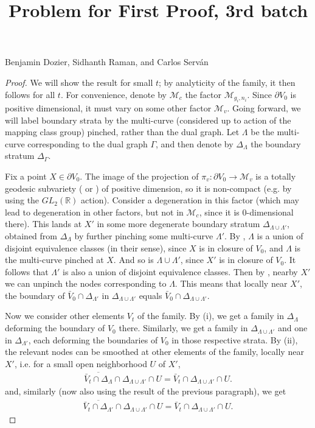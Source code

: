 \documentclass[11pt]{article}
\title{Problem for First Proof, 3rd batch }
\theoremstyle{plain}
\theoremstyle{definition}
\newcommand{\R}{\mathbb{R}}
\newcommand{\M}{\mathcal{M}}
\begin{document}
\begin{center}
{\large Benjamin Dozier, Sidhanth Raman, and Carlos Serv\'an}
\end{center}
\begin{proof}

We will show the result for small $t$; by analyticity of the family, it then follows for all $t$.    For convenience, denote by $\M_c$ the factor $\M_{g_i,n_i}$.  Since $\partial V_0$ is positive dimensional, it must vary on some other factor $\M_{v}$.   Going forward, we will label boundary strata by the multi-curve (considered up to action of the mapping class group) pinched, rather than the dual graph.  Let $\Lambda$ be the multi-curve corresponding to the dual graph $\Gamma$, and then denote by $\Delta_\Lambda$ the boundary stratum $\Delta_\Gamma$.


      
    
    Fix a point $X \in \partial V_0$.  The image of the projection of $\pi_v:\partial V_0 \to \M_v$ is a totally geodesic subvariety (\cite[Theorem 1.4]{bdr24} or \cite[Theorem 1.3]{aw24}) of positive dimension, so it is non-compact (e.g. by using the $GL_2(\R)$ action).  Consider a degeneration in this factor (which may lead to degeneration in other factors, but not in $\M_c$, since it is $0$-dimensional there).  This lands at $X'$ in some more degenerate boundary stratum $\Delta_{\Lambda \cup \Lambda'}$, obtained from $\Delta_\Lambda$ by further pinching some multi-curve $\Lambda'$.  By  \cite[Theorem 1.6 (4)]{aw24}, $\Lambda$ is a union of disjoint equivalence classes (in their sense), since $X$ is in closure of $V_0$, and $\Lambda$ is the multi-curve pinched at $X$. And so is $\Lambda \cup \Lambda'$, since $X'$ is in closure of $V_0$.  It follows that $\Lambda'$ is also a union of disjoint equivalence classes.  Then by \cite[Corollary 3.17]{aw24}, nearby $X'$ we can unpinch the nodes corresponding to $\Lambda$.  This means that locally near $X'$, the boundary of $\bar V_0 \cap \Delta_{\Lambda'}$ in $\Delta_{\Lambda \cup \Lambda'}$ equals $\bar V_0 \cap \Delta_{\Lambda \cup \Lambda'}$.     
    
    Now we consider other elements $V_t$ of the family.  By (i), we get a family in $\Delta_\Lambda$ deforming the boundary of $V_0$ there.  Similarly, we get a family in $\Delta_{\Lambda \cup \Lambda'}$ and one in $\Delta_{\Lambda'}$, each deforming the boundaries of $V_0$ in those respective strata. 
    By (ii), the relevant nodes can be smoothed at other elements of the family, locally near $X'$, %
   i.e.  for a small open neighborhood $U$ of $X'$,
    \begin{align}
        \overline{\bar V_t \cap \Delta_{\Lambda}} \cap \Delta_{\Lambda \cup \Lambda'} \cap U= \bar V_t \cap \Delta_{\Lambda \cup \Lambda'} \cap U. \label{eq:bdy-mon-lam}
    \end{align}
 and, similarly (now also using the result of the previous paragraph), we get
    \begin{align}
        \overline{\bar V_t \cap \Delta_{\Lambda'}} \cap \Delta_{\Lambda \cup \Lambda'} \cap U = \bar V_t \cap \Delta_{\Lambda \cup \Lambda'} \cap U. \label{eq:bdy-mon-lam'}
    \end{align}



\end{proof}
\end{document}
